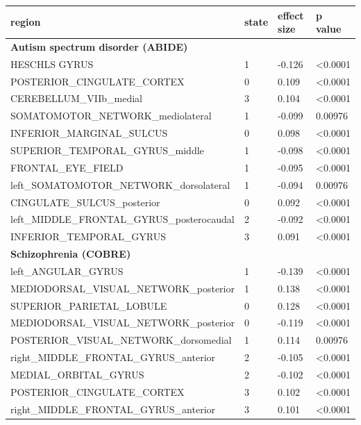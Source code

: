 \documentclass{article}
\begin{document}
\begin{tabular}{p{}p{}p{}p{}}
\toprule
region & state & effect size & p value \\
\hline
\newline
\textbf{Autism spectrum disorder (ABIDE)} &  &  &  \\
HESCHLS GYRUS & 1 & -0.126 & \textless 0.0001 \\
POSTERIOR\_CINGULATE\_CORTEX & 0 & 0.109 & \textless 0.0001 \\
CEREBELLUM\_VIIb\_medial & 3 & 0.104 & \textless 0.0001 \\
SOMATOMOTOR\_NETWORK\_mediolateral & 1 & -0.099 & 0.00976 \\
INFERIOR\_MARGINAL\_SULCUS & 0 & 0.098 & \textless 0.0001 \\
SUPERIOR\_TEMPORAL\_GYRUS\_middle & 1 & -0.098 & \textless 0.0001 \\
FRONTAL\_EYE\_FIELD & 1 & -0.095 & \textless 0.0001 \\
left\_SOMATOMOTOR\_NETWORK\_dorsolateral & 1 & -0.094 & 0.00976 \\
CINGULATE\_SULCUS\_posterior & 0 & 0.092 & \textless 0.0001 \\
left\_MIDDLE\_FRONTAL\_GYRUS\_posterocaudal & 2 & -0.092 & \textless 0.0001 \\
INFERIOR\_TEMPORAL\_GYRUS & 3 & 0.091 & \textless 0.0001 \\
\newline
 \textbf{Schizophrenia (COBRE)} &  &  &  \\
left\_ANGULAR\_GYRUS & 1 & -0.139 & \textless 0.0001 \\
MEDIODORSAL\_VISUAL\_NETWORK\_posterior & 1 & 0.138 & \textless 0.0001 \\
SUPERIOR\_PARIETAL\_LOBULE & 0 & 0.128 & \textless 0.0001 \\
MEDIODORSAL\_VISUAL\_NETWORK\_posterior & 0 & -0.119 & \textless 0.0001 \\
POSTERIOR\_VISUAL\_NETWORK\_dorsomedial & 1 & 0.114 & 0.00976 \\
right\_MIDDLE\_FRONTAL\_GYRUS\_anterior & 2 & -0.105 & \textless 0.0001 \\
MEDIAL\_ORBITAL\_GYRUS & 2 & -0.102 & \textless 0.0001 \\
POSTERIOR\_CINGULATE\_CORTEX & 3 & 0.102 & \textless 0.0001 \\
right\_MIDDLE\_FRONTAL\_GYRUS\_anterior & 3 & 0.101 & \textless 0.0001 \\

\end{tabular}
\end{document}
